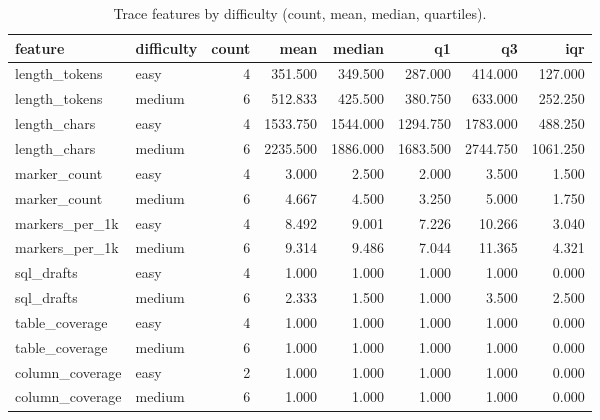\begin{table}[htbp]
\caption{Trace features by difficulty (count, mean, median, quartiles).}
\label{tab:task2_desc_by_difficulty}
\begin{tabular}{llrrrrrr}
\toprule
feature & difficulty & count & mean & median & q1 & q3 & iqr \\
\midrule
length_tokens & easy & 4 & 351.500 & 349.500 & 287.000 & 414.000 & 127.000 \\
length_tokens & medium & 6 & 512.833 & 425.500 & 380.750 & 633.000 & 252.250 \\
length_chars & easy & 4 & 1533.750 & 1544.000 & 1294.750 & 1783.000 & 488.250 \\
length_chars & medium & 6 & 2235.500 & 1886.000 & 1683.500 & 2744.750 & 1061.250 \\
marker_count & easy & 4 & 3.000 & 2.500 & 2.000 & 3.500 & 1.500 \\
marker_count & medium & 6 & 4.667 & 4.500 & 3.250 & 5.000 & 1.750 \\
markers_per_1k & easy & 4 & 8.492 & 9.001 & 7.226 & 10.266 & 3.040 \\
markers_per_1k & medium & 6 & 9.314 & 9.486 & 7.044 & 11.365 & 4.321 \\
sql_drafts & easy & 4 & 1.000 & 1.000 & 1.000 & 1.000 & 0.000 \\
sql_drafts & medium & 6 & 2.333 & 1.500 & 1.000 & 3.500 & 2.500 \\
table_coverage & easy & 4 & 1.000 & 1.000 & 1.000 & 1.000 & 0.000 \\
table_coverage & medium & 6 & 1.000 & 1.000 & 1.000 & 1.000 & 0.000 \\
column_coverage & easy & 2 & 1.000 & 1.000 & 1.000 & 1.000 & 0.000 \\
column_coverage & medium & 6 & 1.000 & 1.000 & 1.000 & 1.000 & 0.000 \\
\bottomrule
\end{tabular}
\end{table}
